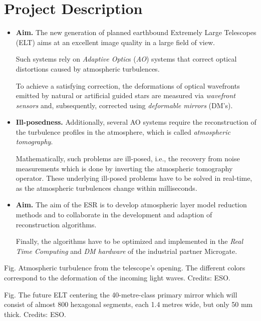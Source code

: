 \documentclass{book}
\numberwithin{equation}{section}
\begin{document}
\section{Project Description}
\begin{itemize}
    \item \textbf{Aim.} The new generation of planned earthbound Extremely Large Telescopes (ELT) aims at an excellent image quality in a large field of view.
    
    Such systems rely on \textit{Adaptive Optic}s (\textit{AO}) systems that correct optical distortions caused by atmospheric turbulences.
    
    To achieve a satisfying correction, the deformations of optical wavefronts emitted by natural or artificial guided stars are measured via \textit{wavefront sensors} and, subsequently, corrected using \textit{deformable mirrors} (DM's).
    \item \textbf{Ill-posedness.} Additionally, several AO systems require the reconstruction of the turbulence profiles in the atmosphere, which is called \textit{atmospheric tomography}.
    
    Mathematically, such problems are ill-posed, i.e., the recovery from noise measurements which is done by inverting the atmospheric tomography operator. These underlying ill-posed problems have to be solved in real-time, as the atmospheric turbulences change within milliseconds.
    \item \textbf{Aim.} The aim of the ESR is to develop atmospheric layer model reduction methods and to collaborate in the development and adaption of reconstruction algorithms.
    
    Finally, the algorithms have to be optimized and implemented in the \textit{Real Time Computing} and \textit{DM hardware} of the industrial partner Microgate.
\end{itemize}

\textsf{Fig. Atmospheric turbulence from the telescope's opening. The different colors correspond to the deformation of the incoming light waves. Credits: ESO.}

\textsf{Fig. The future ELT centering the 40-metre-class primary mirror which will consist of almost 800 hexagonal segments, each 1.4 metres wide, but only 50 mm thick. Credits: ESO.}
\end{document}
